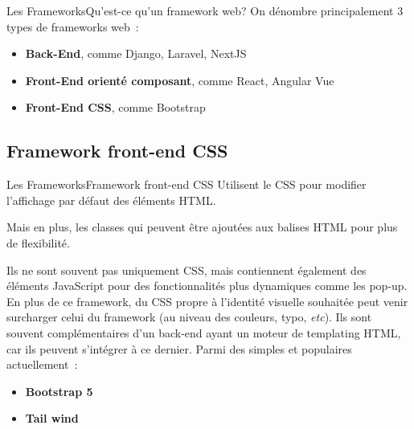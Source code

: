 \documentclass{beamer}
\begin{document}
    \begin{frame}{Les Frameworks}{Qu'est-ce qu'un framework web?}
        On dénombre principalement 3 types de frameworks web~:
        \begin{itemize}
            \item \textbf{Back-End}, comme Django, Laravel, NextJS
            \item \textbf{Front-End orienté composant}, comme React, Angular Vue
            \item \textbf{Front-End CSS}, comme Bootstrap
        \end{itemize}
    \end{frame}

    \subsection{Framework front-end CSS}\label{subsec:framewok-css}

    \begin{frame}{Les Frameworks}{Framework front-end CSS}
        Utilisent le CSS pour modifier l'affichage par défaut des éléments HTML.

        Mais en plus, les classes qui peuvent être ajoutées aux balises HTML pour plus de flexibilité.

        Ils ne sont souvent pas uniquement CSS, mais contiennent également des éléments JavaScript pour des fonctionnalités plus dynamiques comme les pop-up.
        \bigbreak
        En plus de ce framework, du CSS propre à l'identité visuelle souhaitée peut venir surcharger celui du framework (au niveau des couleurs, typo, \textit{etc}).
        \bigbreak
        Ils sont souvent complémentaires d'un back-end ayant un moteur de templating HTML, car ils peuvent s'intégrer à ce dernier.
        \bigbreak
        Parmi des simples et populaires actuellement~:
        \begin{itemize}
            \item \textbf{Bootstrap 5}
            \item \textbf{Tail wind}
        \end{itemize}
    \end{frame}
\end{document}
